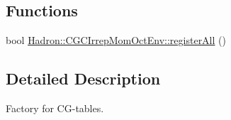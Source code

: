 \subsection*{Functions}
\begin{DoxyCompactItemize}
\item 
bool \mbox{\hyperlink{namespaceHadron_1_1CGCIrrepMomOctEnv_ac421d6769dc91c9ccc748ebbba3d108e}{Hadron\+::\+C\+G\+C\+Irrep\+Mom\+Oct\+Env\+::register\+All}} ()
\end{DoxyCompactItemize}


\subsection{Detailed Description}
Factory for C\+G-\/tables. 

